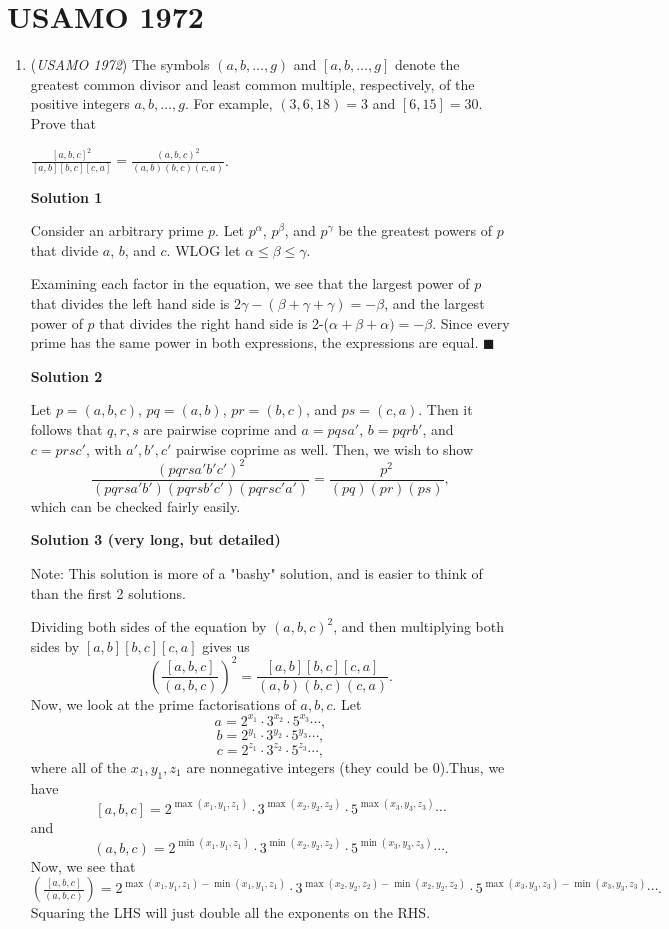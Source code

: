 \section{USAMO 1972}
        \begin{enumerate}
        	\item (\textit{USAMO 1972}) The symbols $(a,b,\ldots,g)$ and $[a,b,\ldots, g]$ denote the greatest common divisor and least common multiple, respectively, of the positive integers $a,b,\ldots, g$. For example, $(3,6,18)=3$ and $[6,15]=30$. Prove that


 $\frac{[a,b,c]^2}{[a,b][b,c][c,a]}=\frac{(a,b,c)^2}{(a,b)(b,c)(c,a)}$.

 



\textbf{Solution 1}

Consider an arbitrary prime $p$. Let $p^\alpha$, $p^\beta$, and $p^\gamma$ be the greatest powers of $p$ that divide $a$, $b$, and $c$. WLOG let $\alpha \leq \beta \leq \gamma$.

 Examining each factor in the equation, we see that the largest power of $p$ that divides the left hand side is $2\gamma -(\beta+\gamma+\gamma) = -\beta$, and the largest power of $p$ that divides the right hand side is 2\alpha -($\alpha + \beta + \alpha) = -\beta$. Since every prime has the same power in both expressions, the expressions are equal. $\blacksquare$




\textbf{Solution 2}

Let $p = (a, b, c)$, $pq = (a, b)$, $pr = (b, c)$, and $ps = (c, a)$. Then it follows that $q, r, s$ are pairwise coprime and $a = pqsa'$, $b = pqrb'$, and $c = prsc'$, with $a', b', c'$ pairwise coprime as well. Then, we wish to show
 \[\frac{(pqrsa'b'c')^2}{(pqrsa'b')(pqrsb'c')(pqrsc'a')} = \frac{p^2}{(pq)(pr)(ps)},\]which can be checked fairly easily.

 



\textbf{Solution 3 (very long, but detailed)}

Note: This solution is more of a "bashy" solution, and is easier to think of than the first 2 solutions.

 Dividing both sides of the equation by $(a,b,c)^2$, and then multiplying both sides by $[a,b][b,c][c,a]$ gives us 
 \[\left(\frac{[a,b,c]}{(a,b,c)}\right)^2 = \frac{[a,b][b,c][c,a]}{(a,b)(b,c)(c,a)}.\]Now, we look at the prime factorisations of $a,b,c$. Let 
 \[a=2^{x_1}\cdot 3^{x_2}\cdot 5^{x_3}\cdots,\]
 \[b=2^{y_1}\cdot 3^{y_2}\cdot 5^{y_3}\cdots,\]
 \[c=2^{z_1}\cdot 3^{z_2}\cdot 5^{z_3}\cdots,\]where all of the $x_1, y_1, z_1$ are nonnegative integers (they could be 0).Thus, we have 
 \[[a,b,c]=2^{\max(x_1,y_1,z_1)} \cdot 3^{\max(x_2,y_2,z_2)} \cdot 5^{\max(x_3,y_3,z_3)} \cdots\]and 
 \[(a,b,c)=2^{\min(x_1,y_1,z_1)} \cdot 3^{\min(x_2,y_2,z_2)} \cdot 5^{\min(x_3,y_3,z_3)} \cdots.\]Now, we see that $\left(\frac{[a,b,c]}{(a,b,c)}\right) = 2^{\max(x_1,y_1,z_1) - \min(x_1,y_1,z_1)} \cdot 3^{\max(x_2,y_2,z_2) - \min(x_2,y_2,z_2)} \cdot 5^{\max(x_3,y_3,z_3) - \min(x_3,y_3,z_3)} \cdots.$ Squaring the LHS will just double all the exponents on the RHS.


\end{enumerate}
